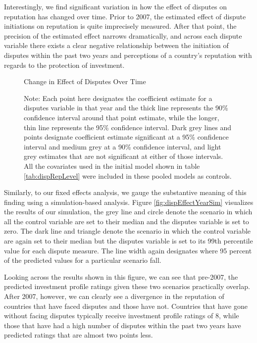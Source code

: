 \documentclass[12pt,onesided]{amsart}
\begin{document}
Interestingly, we find significant variation in how the effect of disputes on reputation has changed over time. Prior to 2007, the estimated effect of dispute initiations on reputation is quite imprecisely measured. After that point, the precision of the estimated effect narrows dramatically, and across each dispute variable there exists a clear negative relationship between the initiation of disputes within the past two years and perceptions of a country's reputation with regards to the protection of investment. 

\begin{figure}[ht]
	\vspace{4cm}
	\centering
	\caption{Change in Effect of Disputes Over Time}
	\label{fig:dispEffectYear}
	\resizebox{1\textwidth}{!}{}
	\caption*{Note: Each point here designates the coefficient estimate for a disputes variable in that year and the thick line represents the 90\% confidence interval around that point estimate, while the longer, thin line represents the 95\% confidence interval. Dark grey lines and points designate coefficient estimate significant at a 95\% confidence interval and medium grey at a 90\% confidence interval, and light grey estimates that are not significant at either of those intervals. All the covariates used in the initial model shown in table \ref{tab:dispRepLevel} were included in these pooled models as controls.}
\end{figure}

Similarly, to our fixed effects analysis, we gauge the substantive meaning of this finding using a simulation-based analysis. Figure \ref{fig:dispEffectYearSim} visualizes the results of our simulation, the grey line and circle denote the scenario in which all the control variable are set to their median and the disputes variable is set to zero. The dark line and triangle denote the scenario in which the control variable are again set to their median but the disputes variable is set to its 99th percentile value for each dispute measure. The line width again designates where 95 percent of the predicted values for a particular scenario fall. 

Looking across the results shown in this figure, we can see that pre-2007, the predicted investment profile ratings given these two scenarios practically overlap. After 2007, however, we can clearly see a divergence in the reputation of countries that have faced disputes and those have not. Countries that have gone without facing disputes typically receive investment profile ratings of 8, while those that have had a high number of disputes within the past two years have predicted ratings that are almost two points less. 
\end{document}
